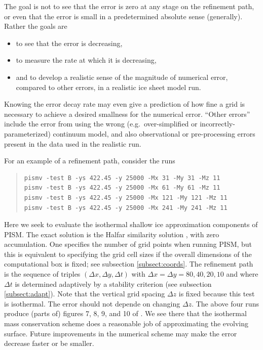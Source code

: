\documentclass[11pt,final]{amsart}
\begin{document}
The goal is not to see that the error is zero at any stage on the refinement path, or even that the error is small in a predetermined absolute sense (generally).  Rather the goals are
\begin{itemize}
\item to see that the error is decreasing,
\item to measure the rate at which it is decreasing,
\item and to develop a realistic sense of the magnitude of numerical error, compared to other errors, in a realistic ice sheet model run.
\end{itemize}
Knowing the error decay rate may even give a prediction of how fine a grid is necessary to achieve a desired smallness for the numerical error.  ``Other errors'' include the error from using the wrong (e.g.~over-simplified or incorrectly-parameterized) continuum model, and also observational or pre-processing errors present in the data used in the realistic run.

For an example of a refinement path, consider the runs
\begin{quote}\small
\begin{verbatim}
pismv -test B -ys 422.45 -y 25000 -Mx 31 -My 31 -Mz 11
pismv -test B -ys 422.45 -y 25000 -Mx 61 -My 61 -Mz 11
pismv -test B -ys 422.45 -y 25000 -Mx 121 -My 121 -Mz 11
pismv -test B -ys 422.45 -y 25000 -Mx 241 -My 241 -Mz 11
\end{verbatim}
\normalsize\end{quote}
Here we seek to evaluate the isothermal shallow ice approximation components of PISM.  The exact solution is the Halfar similarity solution \cite{Halfar83}, with zero accumulation.  One specifies the number of grid points when running PISM, but this is equivalent to specifying the grid cell sizes if the overall dimensions of the computational box is fixed; see subsection \ref{subsect:coords}.  The refinement path is the sequence of triples $(\Delta x,\Delta y,\Delta t)$ with $\Delta x = \Delta y = 80,40,20,10$ and where $\Delta t$ is determined adaptively by a stability criterion (see subsection \ref{subsect:adapt}).  Note that the vertical grid spacing $\Delta z$ is fixed because this test is isothermal.  The error should not depende on changing $\Delta z$.  The above four runs produce (parts of) figures 7, 8, 9, and 10 of \cite{BLKCB}.  We see there that the isothermal mass conservation scheme does a reasonable job of approximating the evolving surface.  Future improvements in the numerical scheme may make the error decrease faster or be smaller.
\end{document}
